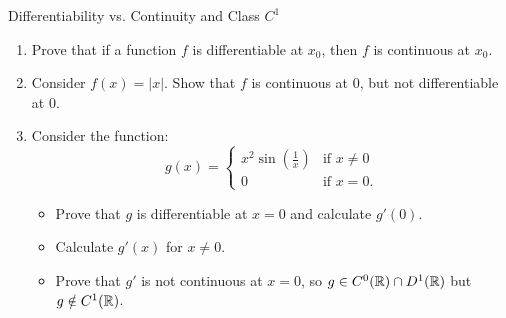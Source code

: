 \begin{exercise}{Differentiability vs. Continuity and Class $C^1$}
\begin{enumerate}[leftmargin=1.5em,itemsep=2pt]
  \item Prove that if a function $f$ is differentiable at $x_0$, then $f$ is continuous at $x_0$.
  \item Consider $f(x) = |x|$. Show that $f$ is continuous at $0$, but not differentiable at $0$.
  \item Consider the function:
  \[
  g(x) = \begin{cases} x^2 \sin\left(\frac{1}{x}\right) & \text{if } x \ne 0 \\ 0 & \text{if } x = 0. \end{cases}
  \]
  \begin{itemize}[leftmargin=1.2em,itemsep=1pt]
    \item[(a)] Prove that $g$ is differentiable at $x = 0$ and calculate $g'(0)$.
    \item[(b)] Calculate $g'(x)$ for $x \ne 0$.
    \item[(c)] Prove that $g'$ is not continuous at $x = 0$, so $g \in C^0(\mathbb{R}) \cap D^1(\mathbb{R})$ but $g \notin C^1(\mathbb{R})$.
  \end{itemize}
\end{enumerate}
\end{exercise}

\begin{tabletworkspace}[5.5cm]
\end{tabletworkspace}

